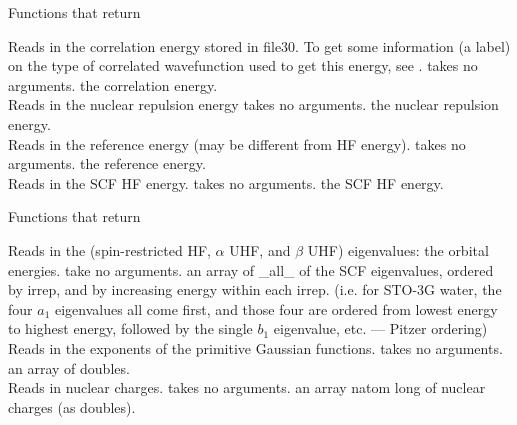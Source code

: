 \begin{center}
Functions that return 
\end{center}
{Reads in the correlation energy stored in file30. To get some
information (a label) on the type of correlated wavefunction
used to get this energy, see .}
{takes no arguments.}
{the correlation energy.} \\
{Reads in the nuclear repulsion energy}
{takes no arguments.}
{the nuclear repulsion energy.} \\
{Reads in the reference energy (may be different from HF energy).}
{takes no arguments.}
{the reference energy.} \\
{Reads in the SCF HF energy.}
{takes no arguments.}
{the SCF HF energy.}

\begin{center}
Functions that return 
\end{center}
{Reads in the (spin-restricted HF, $\alpha$ UHF, and $\beta$ UHF) eigenvalues:
the orbital energies.}
{take no arguments.}
{an array of \_all\_ of the SCF eigenvalues,
ordered by irrep, and by increasing energy within each irrep.
(i.e. for STO-3G water, the four $a_1$ eigenvalues all come first, and
those four are ordered from lowest energy to highest energy,
followed by the single $b_1$ eigenvalue, etc. --- Pitzer ordering)} \\
{Reads in the exponents of the primitive Gaussian functions.}
{takes no arguments.}
{an array of doubles.} \\
{Reads in nuclear charges.}
{takes no arguments.}
{an array natom long of nuclear charges (as doubles).}


